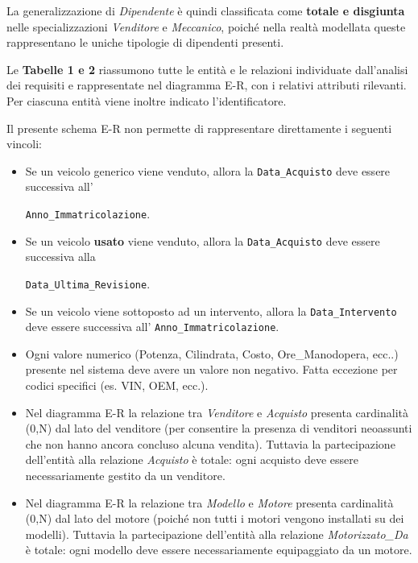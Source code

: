 La generalizzazione di \textit{Dipendente} è quindi classificata come \textbf{totale e disgiunta} nelle specializzazioni \textit{Venditore} e \textit{Meccanico}, poiché nella realtà modellata queste rappresentano le uniche tipologie di dipendenti presenti.

Le \textbf{Tabelle 1 e 2} riassumono tutte le entità e le relazioni individuate dall'analisi dei requisiti e rappresentate nel diagramma E-R, con i relativi attributi rilevanti. Per ciascuna entità viene inoltre indicato l'identificatore.

Il presente schema E-R non permette di rappresentare direttamente i seguenti vincoli:

\begin{itemize}
    \item Se un veicolo generico viene venduto, allora la \texttt{Data\_Acquisto} deve essere successiva all'
    
    \texttt{Anno\_Immatricolazione}.
    \item Se un veicolo \textbf{usato} viene venduto, allora la \texttt{Data\_Acquisto} deve essere successiva alla 
    
    \texttt{Data\_Ultima\_Revisione}.
    \item Se un veicolo viene sottoposto ad un intervento, allora la \texttt{Data\_Intervento} deve essere successiva all' \texttt{Anno\_Immatricolazione}.
    \item Ogni valore numerico (Potenza, Cilindrata, Costo, Ore\_Manodopera, ecc..) presente nel sistema deve avere un valore non negativo. Fatta eccezione per codici specifici (es. VIN, OEM, ecc.).
    \item Nel diagramma E-R la relazione tra \textit{Venditore} e \textit{Acquisto} presenta cardinalità (0,N) dal lato del venditore (per consentire la presenza di venditori neoassunti che non hanno ancora concluso alcuna vendita). Tuttavia la partecipazione dell'entità alla relazione \textit{Acquisto} è totale: ogni acquisto deve essere necessariamente gestito da un venditore.
    \item Nel diagramma E-R la relazione tra \textit{Modello} e \textit{Motore} presenta cardinalità (0,N) dal lato del motore (poiché non tutti i motori vengono installati su dei modelli). Tuttavia la partecipazione dell'entità alla relazione \textit{Motorizzato\_Da} è totale: ogni modello deve essere necessariamente equipaggiato da un motore.

\end{itemize} 

